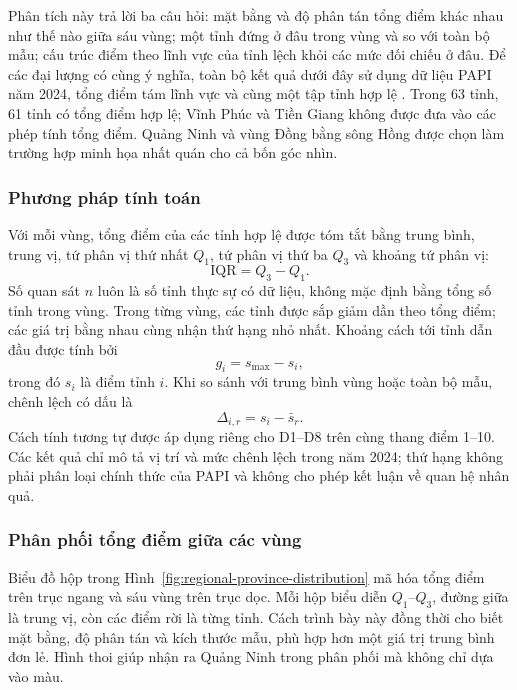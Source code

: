 Phân tích này trả lời ba câu hỏi: mặt bằng và độ phân tán tổng điểm khác nhau như thế nào giữa sáu vùng; một tỉnh đứng ở đâu trong vùng và so với toàn bộ mẫu; cấu trúc điểm theo lĩnh vực của tỉnh lệch khỏi các mức đối chiếu ở đâu. Để các đại lượng có cùng ý nghĩa, toàn bộ kết quả dưới đây sử dụng dữ liệu PAPI năm 2024, tổng điểm tám lĩnh vực và cùng một tập tỉnh hợp lệ \cite{papiDataPortal,undpPapi2024}. Trong 63 tỉnh, 61 tỉnh có tổng điểm hợp lệ; Vĩnh Phúc và Tiền Giang không được đưa vào các phép tính tổng điểm. Quảng Ninh và vùng Đồng bằng sông Hồng được chọn làm trường hợp minh họa nhất quán cho cả bốn góc nhìn.

\subsubsection{Phương pháp tính toán}

Với mỗi vùng, tổng điểm của các tỉnh hợp lệ được tóm tắt bằng trung bình, trung vị, tứ phân vị thứ nhất \(Q_1\), tứ phân vị thứ ba \(Q_3\) và khoảng tứ phân vị:
\begin{equation}
    \mathrm{IQR} = Q_3 - Q_1.
\end{equation}
Số quan sát \(n\) luôn là số tỉnh thực sự có dữ liệu, không mặc định bằng tổng số tỉnh trong vùng. Trong từng vùng, các tỉnh được sắp giảm dần theo tổng điểm; các giá trị bằng nhau cùng nhận thứ hạng nhỏ nhất. Khoảng cách tới tỉnh dẫn đầu được tính bởi
\begin{equation}
    g_i = s_{\max} - s_i,
\end{equation}
trong đó \(s_i\) là điểm tỉnh \(i\). Khi so sánh với trung bình vùng hoặc toàn bộ mẫu, chênh lệch có dấu là
\begin{equation}
    \Delta_{i,r} = s_i - \bar{s}_r.
\end{equation}
Cách tính tương tự được áp dụng riêng cho D1--D8 trên cùng thang điểm 1--10. Các kết quả chỉ mô tả vị trí và mức chênh lệch trong năm 2024; thứ hạng không phải phân loại chính thức của PAPI và không cho phép kết luận về quan hệ nhân quả.

\subsubsection{Phân phối tổng điểm giữa các vùng}

Biểu đồ hộp trong Hình~\ref{fig:regional-province-distribution} mã hóa tổng điểm trên trục ngang và sáu vùng trên trục dọc. Mỗi hộp biểu diễn \(Q_1\)--\(Q_3\), đường giữa là trung vị, còn các điểm rời là từng tỉnh. Cách trình bày này đồng thời cho biết mặt bằng, độ phân tán và kích thước mẫu, phù hợp hơn một giá trị trung bình đơn lẻ. Hình thoi giúp nhận ra Quảng Ninh trong phân phối mà không chỉ dựa vào màu.

